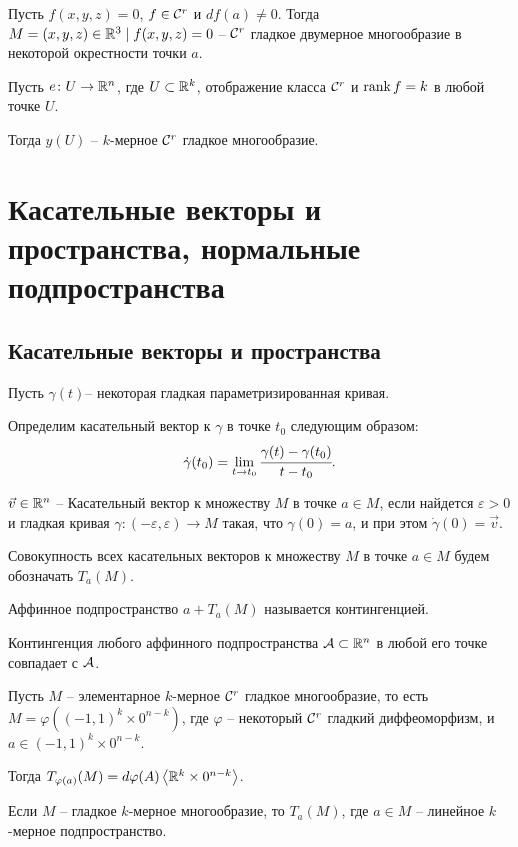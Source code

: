 	\begin{corollary}
		Пусть $f(x,y,z)=0$, $f \in \mathcal{C}^r$ и $df(a) \not= 0$. Тогда $M = {(x,y,z)\in \mathbb{R}^3 \mid f(x,y,z) = 0}$ -- $\mathcal{C}^r$ гладкое двумерное многообразие в некоторой окрестности точки $a$.
	\end{corollary}

	\begin{theorem}
		Пусть $e\colon U \to \mathbb{R}^n$, где $U \subset \mathbb{R}^k$, отображение класса $\mathcal{C}^r$ и $\text{rank\,}f = k$ в любой точке $U$.
		
		Тогда $y(U)$ -- $k$-мерное $\mathcal{C}^r$ гладкое многообразие. 
	\end{theorem}

	\section{Касательные векторы и пространства, нормальные подпространства}
	\subsection{Касательные векторы и пространства}
	\begin{mdef}
		Пусть $\gamma(t)$-- некоторая гладкая параметризированная кривая.
		
		Определим касательный вектор к $\gamma$ в точке $t_0$ следующим образом:
		$$
			\dot \gamma (t_0) = \lim \limits_{t\to t_0} \cfrac {\gamma(t) - \gamma(t_0)} {t - t_0}.
		$$
	\end{mdef}
	\begin{mdef}
		$\vec v \in \mathbb{R}^n$ -- Касательный вектор к множеству $M$ в точке $a\in M$, если найдется $\varepsilon >0$ и гладкая кривая $\gamma\colon (-\varepsilon, \varepsilon) \to M$ такая, что $\gamma(0) = a$, и при этом $\dot \gamma(0) = \vec v$. 
		
		Совокупность всех касательных векторов к множеству $M$ в точке $a\in M$ будем обозначать $T_a(M)$.
	\end{mdef}
	\begin{remark}
		Аффинное подпространство $a+T_a(M)$ называется контингенцией.
	\end{remark}
	\begin{statement}
		Контингенция любого аффинного подпространства $\mathcal{A} \subset \mathbb{R}^n$ в любой его точке совпадает с $\mathcal{A}$.
	\end{statement}	
	\begin{statement}
		Пусть $M$ -- элементарное $k$-мерное $\mathcal{C}^r$ гладкое многообразие, то есть $M = \varphi((-1, 1)^k \times 0^{n-k})$, где $\varphi$ -- некоторый $\mathcal{C}^r$ гладкий диффеоморфизм, и $a \in (-1, 1)^k \times 0^{n-k}$.
		
		Тогда $T_{\varphi(a)}(M) = d\varphi(A)\left< \mathbb{R}^k \times 0^{n-k}\right>$.
	\end{statement}	
	\begin{corollary}
		Если $M$ -- гладкое $k$-мерное многообразие, то $T_a(M)$, где $a \in M$ -- линейное $k$-мерное подпространство.
	\end{corollary}
